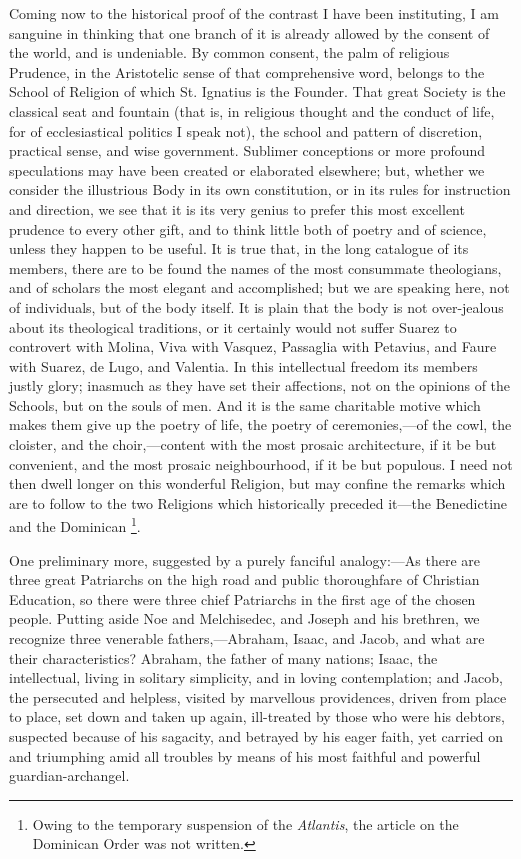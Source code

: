 Coming now to the historical proof of the contrast I have been
instituting, I am sanguine in thinking that one branch of it is
already allowed by the consent of the world, and is undeniable. By
common consent, the palm of religious Prudence, in the Aristotelic
sense of that comprehensive word, belongs to the School of Religion of
which St. Ignatius is the Founder. That great Society is the classical
seat and fountain (that is, in religious thought and the conduct of
life, for of ecclesiastical politics I speak not), the school and
pattern of discretion, practical sense, and wise government. Sublimer
conceptions or more profound speculations may have been created or
elaborated elsewhere; but, whether we consider the illustrious Body in
its own constitution, or in its rules for instruction and direction,
we see that it is its very genius to prefer this most excellent
prudence to every other gift, and to think little both of poetry and
of science, unless they happen to be useful. It is true that, in the
long catalogue of its members, there are to be found the names of the
most consummate theologians, and of scholars the most elegant and
accomplished; but we are speaking here, not of individuals, but of the
body itself. It is plain that the body is not over-jealous about its
theological traditions, or it certainly would not suffer Suarez to
controvert with Molina, Viva with Vasquez, Passaglia with Petavius,
and Faure with Suarez, de Lugo, and Valentia. In this intellectual
freedom its members justly glory; inasmuch as they have set their
affections, not on the opinions of the Schools, but on the souls of
men. And it is the same charitable motive which makes them give
up the poetry of life, the poetry of ceremonies,—of the cowl, the
cloister, and the choir,—content with the most prosaic architecture,
if it be but convenient, and the most prosaic neighbourhood, if it be
but populous. I need not then dwell longer on this wonderful Religion,
but may confine the remarks which are to follow to the two Religions
which historically preceded it—the Benedictine and the Dominican \footnote{Owing to the temporary suspension of the \emph{Atlantis}, the
article on the Dominican Order was not written.}.

One preliminary more, suggested by a purely fanciful analogy:—As
there are three great Patriarchs on the high road and public
thoroughfare of Christian Education, so there were three chief
Patriarchs in the first age of the chosen people. Putting aside Noe
and Melchisedec, and Joseph and his brethren, we recognize three
venerable fathers,—Abraham, Isaac, and Jacob, and what are their
characteristics? Abraham, the father of many nations; Isaac, the
intellectual, living in solitary simplicity, and in loving
contemplation; and Jacob, the persecuted and helpless, visited by
marvellous providences, driven from place to place, set down and taken
up again, ill-treated by those who were his debtors, suspected because
of his sagacity, and betrayed by his eager faith, yet carried on and
triumphing amid all troubles by means of his most faithful and
powerful guardian-archangel.

